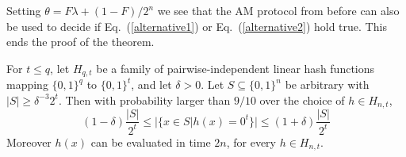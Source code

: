 Setting $\theta = F \lambda + (1 - F)/2^n$ we see that the AM protocol from before can also be used to decide if Eq.~(\ref{alternative1}) or Eq.~(\ref{alternative2}) hold true. This ends the proof of the theorem. 

\begin{lemma}  \label{hashfunction}
\cite{AB09} For $t \leq q$, let $H_{q, t}$ be a family of pairwise-independent linear hash functions mapping $\{0, 1 \}^q$ to $\{0, 1 \}^t$, and let $\delta > 0$. Let $S \subseteq \{0, 1 \}^n$ be arbitrary with 
$|S| \geq \delta^{-3} 2^t$. Then with probability larger than $9/10$ over the choice of $h \in H_{n, t}$,
\begin{equation}
  (1 - \delta) \frac{|S|}{2^t} \leq |  \{ x \in S | h(x) = 0^t    \}   | \leq(1 + \delta) \frac{|S|}{2^t}  
\end{equation}
Moreover $h(x)$ can be evaluated in time $2n$, for every $h \in H_{n, t}$. 
\end{lemma}

  
